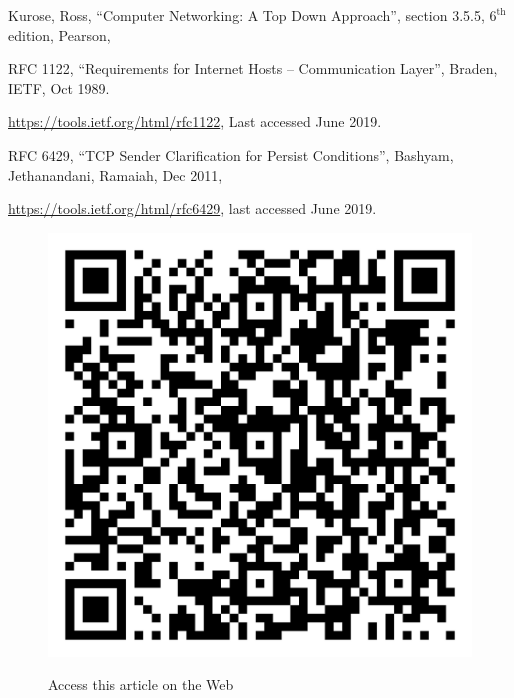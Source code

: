 \begin{multicols}{2}
\begin{thebibliography}{99}
 Kurose, Ross, “Computer Networking: A Top Down Approach”, section 3.5.5, $6^{\text{th}}$ edition, Pearson, 

RFC 1122, “Requirements for Internet Hosts -- Communication Layer”, Braden, IETF, Oct 1989. 

\url{https://tools.ietf.org/html/rfc1122}, Last accessed June 2019.

 RFC 6429, “TCP Sender Clarification for Persist Conditions”, Bashyam, Jethanandani, Ramaiah, Dec 2011, 

\url{https://tools.ietf.org/html/rfc6429}, last accessed June 2019.

\end{thebibliography}
\end{multicols}

\begin{figure}[H]
\centering
\includegraphics[scale=.15]{src/Figures/QR-codes/qr-code_experiential-learning.png}

\medskip

{\large\sf Access this article on the Web}
\end{figure}
